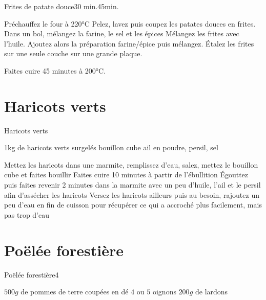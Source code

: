 {\begin{recette}{Frites de patate douce}{}{30 min.}{45min.}
\begin{preparation}
\etape Préchauffez le four à 220°C
\etape Pelez, lavez puis coupez les patates douces en frites.
\etape Dans un bol, mélangez la farine, le sel et les épices
\etape Mélangez les frites avec l'huile. Ajoutez alors la préparation farine/épice puis mélangez.
\etape Étalez les frites sur une seule couche sur une grande plaque.
\end{preparation}

\begin{cuisson}
Faites cuire 45 minutes à 200°C.
\end{cuisson}
\end{recette}

\section{Haricots verts}
\begin{recette}{Haricots verts}{}{}{}
\begin{ingredients}
\ingredient 1kg de haricots verts surgelés
\ingredient bouillon cube
\ingredient ail en poudre, persil, sel
\end{ingredients}

\begin{preparation}
\etape Mettez les haricots dans une marmite, remplissez d'eau, salez, mettez le bouillon cube et faites bouillir
\etape Faites cuire 10 minutes à partir de l'ébullition
\etape Égouttez puis faites revenir 2 minutes dans la marmite avec un peu d'huile, l'ail et le persil afin d'assécher les haricots
\etape Versez les haricots ailleurs puis au besoin, rajoutez un peu d'eau en fin de cuisson pour récupérer ce qui a accroché plus facilement, mais pas trop d'eau
\end{preparation}
\end{recette}

\section{Poëlée forestière}
\begin{recette}{Poëlée forestière}{4}{}{}
\begin{ingredients}
\ingredient $500\unit{g}$ de pommes de terre coupées en dé
\ingredient $4$ ou $5$ oignons
\ingredient $200\unit{g}$ de lardons
\end{ingredients}


\end{recette}}
